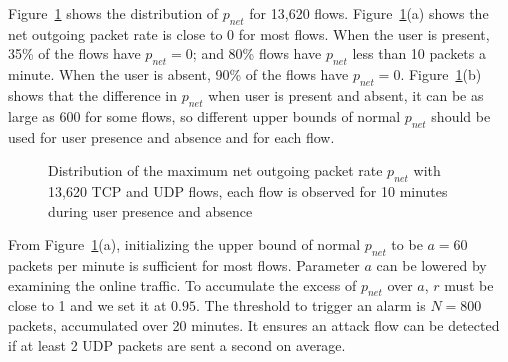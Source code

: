 Figure~\ref{fig:ddos} shows the distribution of $p_{net}$ for 13,620 flows.
Figure~\ref{fig:ddos}(a) shows the net outgoing packet rate is close
to 0 for most flows. When the user is present, 35\% of the flows
have $p_{net}=0$; and 80\% flows have $p_{net}$ less than 10 packets
a minute. When the user is absent, 90\% of the flows have
$p_{net}=0$. Figure~\ref{fig:ddos}(b) shows that the difference in
$p_{net}$ when user is present and absent, it can be as large as 600
for some flows, so different upper bounds of normal $p_{net}$ should
be used for user presence and absence and for each flow.

\begin{figure}[htb]
\centering {}
\caption{Distribution of the maximum net outgoing
packet rate $p_{net}$ with 13,620 TCP and UDP flows, each flow is
observed for 10 minutes during user presence and absence}
\label{fig:ddos}
\end{figure}

From Figure~\ref{fig:ddos}(a), initializing the upper bound of normal
$p_{net}$ to be $a=60$ packets per minute is sufficient for most
flows. Parameter $a$ can be lowered by examining the online traffic. To
accumulate the excess of $p_{net}$ over $a$, $r$ must be close to 1
and we set it at $0.95$. The threshold to trigger an alarm is
$N=800$ packets, accumulated over 20 minutes. It ensures an attack
flow can be detected if at least 2 UDP packets are sent a second on
average.

